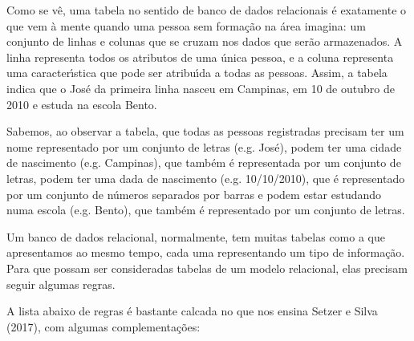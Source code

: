 \documentclass[
12pt,		%
openright,	%
twoside,  %
a4paper,			%
chapter=TITLE,		%
english,			%
french,				%
spanish,			%
brazil				%
]{USPSC-classe/USPSC}
\begin{document}
Como se v\^e, uma tabela no sentido de banco de dados relacionais \'e exatamente o que vem \`a mente quando uma pessoa sem forma\c{c}\~ao na \'area imagina: um conjunto de linhas e colunas que se cruzam nos dados que ser\~ao armazenados. A linha representa todos os atributos de uma \'unica pessoa, e a coluna representa uma caracter\'{\i}stica que pode ser atribu\'{\i}da a todas as pessoas. Assim, a tabela indica que o  Jos\'e da primeira linha nasceu em Campinas, em 10 de outubro de 2010 e estuda na escola Bento.









Sabemos, ao observar a tabela, que todas as pessoas registradas precisam ter um nome representado por um conjunto de letras (e.g. Jos\'e), podem ter uma cidade de nascimento (e.g. Campinas), que tamb\'em \'e representada por um conjunto de letras, podem ter uma dada de nascimento (e.g. 10/10/2010), que \'e representado por um conjunto de n\'umeros separados por barras e podem estar estudando numa escola (e.g. Bento), que tamb\'em \'e representado por um conjunto de letras.









Um banco de dados relacional, normalmente, tem muitas tabelas como a que apresentamos ao mesmo tempo, cada uma representando um tipo de informa\c{c}\~ao. Para que possam ser consideradas tabelas de um modelo relacional, elas precisam seguir algumas regras.









A lista abaixo de regras \'e bastante calcada no que nos ensina  Setzer e Silva (2017), com algumas complementa\c{c}\~oes:
\end{document}
